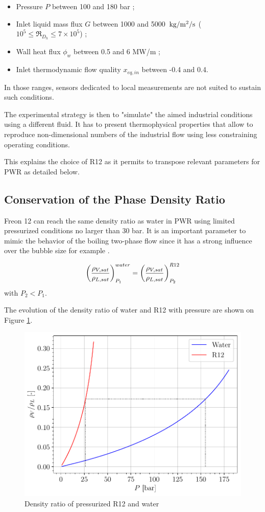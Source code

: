 \begin{itemize}
\item Pressure $P$ between 100 and 180 bar ;
\item Inlet liquid mass flux $G$ between 1000 and 5000~$\text{kg/m$^{2}$/s}$ (\ie $10^{5} \leq \Re_{D_{h}} \leq 7\times 10^{5}$) ;
\item Wall heat flux $\phi_{w}$ between 0.5 and 6 MW/m ;
\item Inlet thermodynamic flow quality $x_{eq,in}$ between -0.4 and 0.4.
\end{itemize}

In those ranges, sensors dedicated to local measurements are not suited to sustain such conditions. 

\npar

The experimental strategy is then to "simulate" the aimed industrial conditions using a different fluid. It has to present thermophysical properties that allow to reproduce non-dimensional numbers of the industrial flow using less constraining operating conditions.

\npar

This explains the choice of R12 as it permits to transpose relevant parameters for PWR as detailed below.

\subsection{Conservation of the Phase Density Ratio}


Freon 12 can reach the same density ratio as water in PWR using limited pressurized conditions no larger than 30 bar. It is an important parameter to mimic the behavior of the boiling two-phase flow since it has a strong influence over the bubble size for example \cite{kocamustafaogullari_pressure_1983}.

\begin{equation}
\left( \frac{\rho_{V,sat}}{\rho_{L,sat}} \right)_{P_{1}}^{water} = \left( \frac{\rho_{V,sat}}{\rho_{L,sat}} \right)_{P_{2}}^{R12}
\end{equation} 
with $P_{2} < P_{1}$.

\npar

The evolution of the density ratio of water and R12 with pressure are shown on Figure \ref{fig:rhost_R12_PWR}.

\begin{figure}[!h]
\centering
\includegraphics[width=0.6\linewidth]{img/DEBORA/rhost_R12_PWR.pdf}
\caption{Density ratio of pressurized R12 and water}
\label{fig:rhost_R12_PWR}
\end{figure}


